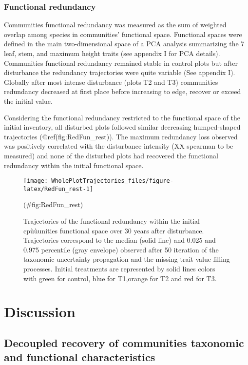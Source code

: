 \documentclass[fleqn,10pt]{ArtEcoFoG} %
\theoremstyle{definition}
\theoremstyle{definition}
\theoremstyle{definition}
\theoremstyle{remark}
\begin{document}
\subsubsection{Functional redundancy}\label{functional-redundancy}

Communities functional redundancy was measured as the sum of weighted
overlap among species in communities' functional space. Functional
spaces were defined in the main two-dimensional space of a PCA analysis
summarizing the 7 leaf, stem, and maximum height traits (see appendix I
for PCA details). Communities functional redundancy remained stable in
control plots but after disturbance the redundancy trajectories were
quite variable (See appendix I). Globally after most intense disturbance
(plots T2 and T3) communities redundancy decreased at first place before
increasing to edge, recover or exceed the initial value.

Considering the functional redundancy restricted to the functional space
of the initial inventory, all disturbed plots followed similar
decreasing humped-shaped trajectories (@ref(fig:RedFun\_rest)). The
maximum redundancy loss observed was positively correlated with the
disturbance intensity (XX spearman to be measured) and none of the
disturbed plots had recovered the functional redundancy within the
initial functional space.

\begin{figure}

{\centering \texttt{[image: WholePlotTrajectories\_files/figure-latex/RedFun\_rest-1]} 

}

\caption{Trajectories of the functional redundancy within the initial cpùùunities functional space over 30 years after disturbance. Trajectories correspond to the median (solid line) and 0.025 and 0.975 percentile (gray envelope) observed after 50 iteration of the taxonomic uncertainty propagation and the missing trait value filling processes. Initial treatments are represented by solid lines colors with green for control, blue for T1,orange for T2 and red for T3.}(\#fig:RedFun_rest)
\end{figure}

\section{Discussion}\label{discussion}

\subsection{Decoupled recovery of communities taxonomic and functional
characteristics}\label{decoupled-recovery-of-communities-taxonomic-and-functional-characteristics}
\end{document}
